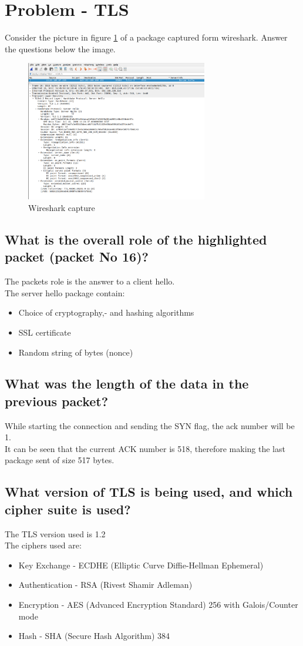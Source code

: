 \documentclass[12pt, a4paper]{article}
\begin{document}
	\section{Problem - TLS}
		Consider the picture in figure \ref{fig:wireshark} of a package captured form wireshark. Answer the questions below the image.
		\begin{figure}[h]
			\centering
			\includegraphics[width=300px]{assets/wireshark.png}
			\caption{Wireshark capture}
			\label{fig:wireshark}
		\end{figure}
		\subsection{What is the overall role of the highlighted packet (packet No 16)?}
			The packets role is the answer to a client hello.\\
			The server hello package contain:
			\begin{itemize}
				\item Choice of cryptography,- and hashing algorithms
				\item SSL certificate
				\item Random string of bytes (nonce)
			\end{itemize}
		\subsection{What was the length of the data in the previous packet?}
			While starting the connection and sending the SYN flag, the ack number will be 1.\\
			It can be seen that the current ACK number is 518, therefore making the last package sent of size 517 bytes.
		\subsection{What version of TLS is being used, and which cipher suite is used?}
			The TLS version used is 1.2\\
			The ciphers used are:
			\begin{itemize}
				\item Key Exchange -  ECDHE (Elliptic Curve Diffie-Hellman Ephemeral)
				\item Authentication - RSA (Rivest Shamir Adleman)
				\item Encryption - AES (Advanced Encryption Standard) 256 with Galois/Counter mode
				\item Hash - SHA (Secure Hash Algorithm) 384
			\end{itemize}
\end{document}
